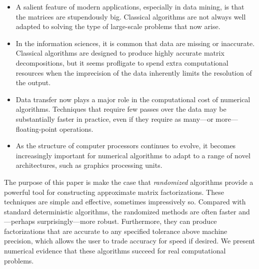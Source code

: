 \documentclass[final]{siamltex}
\newcounter{algorithm}[section]
\newcommand{\notate}[1]{\textcolor{red}{\textbf{[#1]}}}
\begin{document}
\lsp

\begin{itemize}
\item   A salient feature of modern applications, especially in data mining,
is that the matrices are stupendously big.  Classical algorithms are not
always well adapted to solving the type of large-scale problems that now arise.

\item   In the information sciences, it is common that data are missing or
inaccurate.  Classical algorithms are designed to produce highly accurate
matrix decompositions, but it seems profligate to spend extra computational
resources when the imprecision of the data inherently limits the resolution
of the output.

\item   Data transfer now plays a major role in the computational cost of
numerical algorithms.  Techniques that require few passes
over the data may be substantially faster in practice, even if
they require as many---or more---floating-point operations.


\item   As the structure of computer processors continues to evolve, it
becomes increasingly important for numerical algorithms to adapt to a range of
novel architectures, such as graphics processing units.
\end{itemize}

\lsp


The purpose of this paper is make the case that \emph{randomized} algorithms provide a
powerful tool for constructing approximate matrix factorizations.
These techniques are simple and effective, sometimes impressively so.
Compared with standard deterministic algorithms, the
randomized methods are often faster and---perhaps
surprisingly---more robust.  Furthermore, they can produce
factorizations that are accurate to any specified tolerance above
machine precision, which allows the user to trade accuracy for speed
if desired.
We present numerical evidence that
these algorithms succeed for real computational problems.
\end{document}
